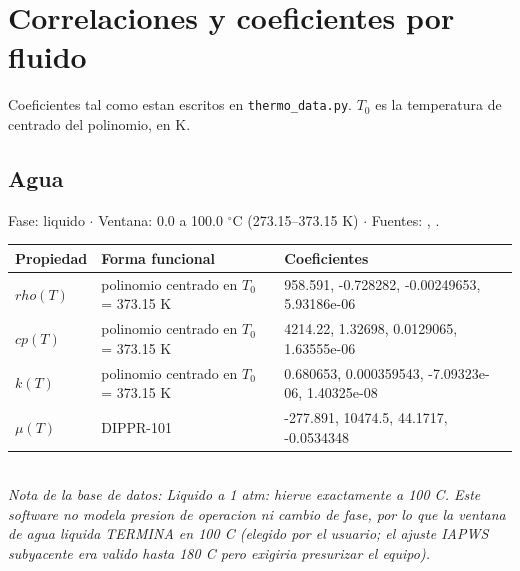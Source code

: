 \documentclass[11pt,a4paper]{article}
\begin{document}
\section{Correlaciones y coeficientes por fluido}
Coeficientes tal como estan escritos en \texttt{thermo\_data.py}. $T_0$ es la
temperatura de centrado del polinomio, en K.

\subsection*{Agua}
{\small\color{gristexto} Fase: liquido $\cdot$ Ventana:
 0.0 a 100.0 $^\circ$C (273.15--373.15 K)
 $\cdot$ Fuentes: \cite{iapws-if97}, \cite{iapws-transporte}.}\\[2pt]
\begin{tabular}{llp{7.6cm}}
\toprule
\textbf{Propiedad} & \textbf{Forma funcional} & \textbf{Coeficientes} \\
\midrule
$rho(T)$ & polinomio centrado en $T_0$ = 373.15 K & 958.591, -0.728282, -0.00249653, 5.93186e-06 \\
$cp(T)$ & polinomio centrado en $T_0$ = 373.15 K & 4214.22, 1.32698, 0.0129065, 1.63555e-06 \\
$k(T)$ & polinomio centrado en $T_0$ = 373.15 K & 0.680653, 0.000359543, -7.09323e-06, 1.40325e-08 \\
$\mu(T)$ & DIPPR-101 & -277.891, 10474.5, 44.1717, -0.0534348 \\
\bottomrule
\end{tabular}\\[3pt]
{\footnotesize\itshape Nota de la base de datos: Liquido a 1 atm: hierve exactamente a 100 C. Este software no modela presion de operacion ni cambio de fase, por lo que la ventana de agua liquida TERMINA en 100 C (elegido por el usuario; el ajuste IAPWS subyacente era valido hasta 180 C pero exigiria presurizar el equipo).}
\vspace{0.7em}
\end{document}

